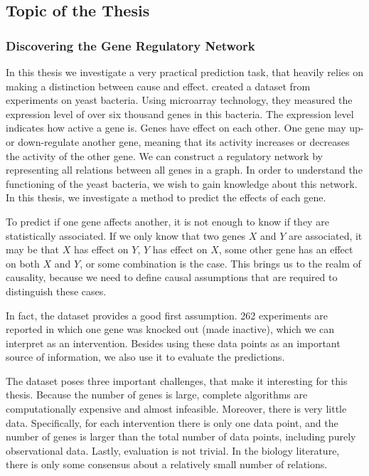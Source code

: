 \subsection{Topic of the Thesis}

\subsubsection{Discovering the Gene Regulatory Network}

In this thesis we investigate a very practical prediction task, that heavily relies on making a distinction between cause and effect. \citet{kemmeren2014large} created a dataset from experiments on yeast bacteria. Using microarray technology, they measured the expression level of over six thousand genes in this bacteria. The expression level indicates how active a gene is. Genes have effect on each other. One gene may up- or down-regulate another gene, meaning that its activity increases or decreases the activity of the other gene. We can construct a regulatory network by representing all relations between all genes in a graph. In order to understand the functioning of the yeast bacteria, we wish to gain knowledge about this network. In this thesis, we investigate a method to predict the effects of each gene.

To predict if one gene affects another, it is not enough to know if they are statistically associated. If we only know that two genes $X$ and $Y$ are associated, it may be that $X$ has effect on $Y$, $Y$ has effect on $X$, some other gene has an effect on both $X$ and $Y$, or some combination is the case. This brings us to the realm of causality, because we need to define causal assumptions that are required to distinguish these cases. 

In fact, the dataset provides a good first assumption. 262 experiments are reported in which one gene was knocked out (made inactive), which we can interpret as an intervention. Besides using these data points as an important source of information, we also use it to evaluate the predictions.

The dataset poses three important challenges, that make it interesting for this thesis. Because the number of genes is large, complete algorithms are computationally expensive and almost infeasible. Moreover, there is very little data. Specifically, for each intervention there is only one data point, and the number of genes is larger than the total number of data points, including purely observational data. Lastly, evaluation is not trivial. In the biology literature, there is only some consensus about a relatively small number of relations.

